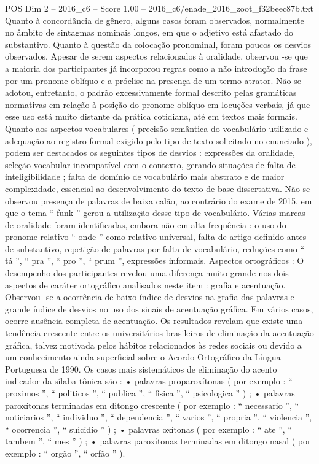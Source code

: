 \begin{textsample}{POS Dim 2 – 2016\_c6 – Score 1.00 – 2016\_c6/enade\_2016\_zoot\_f32beec87b.txt}
Quanto à concordância de gênero, alguns casos foram observados, normalmente no âmbito de sintagmas nominais longos, em que o adjetivo está afastado do substantivo.
Quanto à questão da colocação pronominal, foram poucos os desvios observados.
Apesar de serem aspectos relacionados à oralidade, observou -se que a maioria dos participantes já incorporou regras como a não introdução da frase por um pronome oblíquo e a próclise na presença de um termo atrator.
Não se adotou, entretanto, o padrão excessivamente formal descrito pelas gramáticas normativas em relação à posição do pronome oblíquo em locuções verbais, já que esse uso está muito distante da prática cotidiana, até em textos mais formais.
Quanto aos aspectos vocabulares ( precisão semântica do vocabulário utilizado e adequação ao registro formal exigido pelo tipo de texto solicitado no enunciado ), podem ser destacados os seguintes tipos de desvios : expressões da oralidade, seleção vocabular incompatível com o contexto, gerando situações de falta de inteligibilidade ; falta de domínio de vocabulário mais abstrato e de maior complexidade, essencial ao desenvolvimento do texto de base dissertativa.
Não se observou presença de palavras de baixa calão, ao contrário do exame de 2015, em que o tema “ funk ” gerou a utilização desse tipo de vocabulário.
Várias marcas de oralidade foram identificadas, embora não em alta frequência : o uso do pronome relativo “ onde ” como relativo universal, falta de artigo definido antes de substantivo, repetição de palavras por falta de vocabulário, reduções como “ tá ”, “ pra ”, “ pro ”, “ prum ”, expressões informais.
Aspectos ortográficos : O desempenho dos participantes revelou uma diferença muito grande nos dois aspectos de caráter ortográfico analisados neste item : grafia e acentuação.
Observou -se a ocorrência de baixo índice de desvios na grafia das palavras e grande índice de desvios no uso dos sinais de acentuação gráfica.
Em vários casos, ocorre ausência completa de acentuação.
Os resultados revelam que existe uma tendência crescente entre os universitários brasileiros de eliminação da acentuação gráfica, talvez motivada pelos hábitos relacionados às redes sociais ou devido a um conhecimento ainda superficial sobre o Acordo Ortográfico da Língua Portuguesa de 1990.
Os casos mais sistemáticos de eliminação do acento indicador da sílaba tônica são : • palavras proparoxítonas ( por exemplo : “ proximos ”, “ politicos ”, “ publica ”, “ fisica ”, “ psicologica ” ) ; • palavras paroxítonas terminadas em ditongo crescente ( por exemplo : “ necessario ”, “ noticiarios ”, “ individuo ”, “ dependencia ”, “ varios ”, “ propria ”, “ violencia ”, “ ocorrencia ”, “ suicidio ” ) ; • palavras oxítonas ( por exemplo : “ ate ”, “ tambem ”, “ mes ” ) ; • palavras paroxítonas terminadas em ditongo nasal ( por exemplo : “ orgão ”, “ orfão ” ).

\end{textsample}
